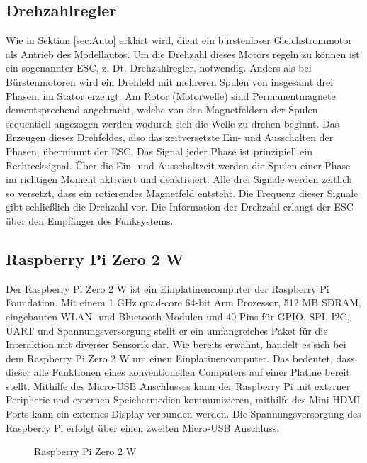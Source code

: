 \subsection{Drehzahlregler}
\label{subsec:ESC}
Wie in Sektion \ref{sec:Auto} erklärt wird, dient ein bürstenloser Gleichstrommotor als Antrieb des Modellautos. Um die Drehzahl dieses Motors regeln zu können ist ein sogenannter \ac{ESC}, z. Dt. Drehzahlregler, notwendig. Anders als bei Bürstenmotoren wird ein Drehfeld mit mehreren Spulen von insgesamt drei Phasen, im Stator erzeugt. Am Rotor (Motorwelle) sind Permanentmagnete dementsprechend angebracht, welche von den Magnetfeldern der Spulen sequentiell angezogen werden wodurch sich die Welle zu drehen beginnt. Das Erzeugen dieses Drehfeldes, also das zeitversetzte Ein- und Ausschalten der Phasen, übernimmt der \ac{ESC}. Das Signal jeder Phase ist prinzipiell ein Rechtecksignal. Über die Ein- und Ausschaltzeit werden die Spulen einer Phase im richtigen Moment aktiviert und deaktiviert. Alle drei Signale werden zeitlich so versetzt, dass ein rotierendes Magnetfeld entsteht. Die Frequenz dieser Signale gibt schließlich die Drehzahl vor. Die Information der Drehzahl erlangt der \ac{ESC} über den Empfänger des Funksystems.

\subsection{Raspberry Pi Zero 2 W}
\label{subsec:tRasPi}
Der Raspberry Pi Zero 2 W ist ein Einplatinencomputer der Raspberry Pi Foundation. Mit einem 1 \ac{GHz} quad-core 64-bit Arm Prozessor, 512 \ac{MB} \ac{SDRAM}, eingebauten \ac{WLAN}- und Bluetooth-Modulen und 40 Pins für \ac{GPIO}, \ac{SPI}, \ac{I2C}, \ac{UART} und Spannungsversorgung stellt er ein umfangreiches Paket für die Interaktion mit diverser Sensorik dar. Wie bereits erwähnt, handelt es sich bei dem Raspberry Pi Zero 2 W um einen Einplatinencomputer. Das bedeutet, dass dieser alle Funktionen eines konventionellen Computers auf einer Platine bereit stellt. Mithilfe des Micro-\ac{USB} Anschlusses kann der Raspberry Pi mit externer Peripherie und externen Speichermedien kommunizieren, mithilfe des Mini \ac{HDMI} Ports kann ein externes Display verbunden werden. Die Spannungsversorgung des Raspberry Pi erfolgt über einen zweiten Micro-\ac{USB} Anschluss.
\begin{figure}[h]
\centering
\missingfigure{}
\caption{Raspberry Pi Zero 2 W}
\label{fig:RaspberryPiZero2W}
\end{figure}

